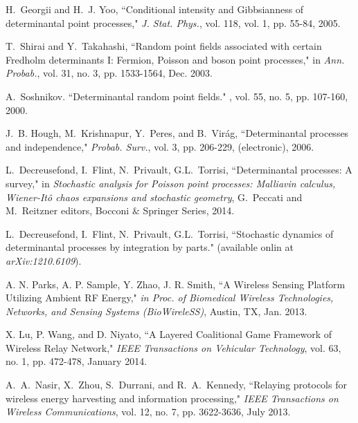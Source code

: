 \documentclass[12pt,draftclsnofoot,onecolumn]{IEEEtran}
\begin{document}
\begin{thebibliography}{99}
H.~Georgii and H.~J. Yoo, ``Conditional intensity and Gibbsianness of determinantal point processes," {\em J. Stat. Phys.}, vol. 118, vol. 1, pp. 55-84, 2005.

T.~Shirai and Y.~Takahashi, ``Random point fields associated with certain Fredholm determinants I: Fermion, Poisson and boson point processes," in {\em Ann. Probab.}, vol. 31, no. 3, pp. 1533-1564, Dec. 2003.

A.~Soshnikov. \newblock ``Determinantal random point fields." , vol. 55, no. 5, pp. 107-160, 2000.


J.~B. Hough, M.~Krishnapur, Y.~Peres, and B.~Vir{\'a}g, ``Determinantal processes and independence," {\em Probab. Surv.}, vol. 3, pp. 206-229, (electronic), 2006.

L.~Decreusefond, I.~Flint, N.~Privault, G.L.~Torrisi, ``Determinantal processes: A survey," in {\em Stochastic analysis for Poisson point processes: Malliavin calculus, Wiener-It\^o chaos expansions and stochastic geometry}, G.~Peccati and M.~Reitzner editors, Bocconi $\&$ Springer Series, 2014.

L.~Decreusefond, I.~Flint, N.~Privault, G.L.~Torrisi, ``Stochastic dynamics of determinantal processes by integration by parts."  (available onlin at {\em arXiv:1210.6109}).

A. N. Parks, A. P. Sample, Y. Zhao, J. R. Smith, ``A Wireless Sensing
Platform Utilizing Ambient RF Energy," \emph{in Proc. of Biomedical Wireless Technologies, Networks, and Sensing Systems (BioWireleSS)}, Austin, TX, Jan. 2013.

X. Lu, P. Wang, and D. Niyato, ``A Layered Coalitional Game Framework of Wireless Relay Network," \emph{IEEE Transactions on Vehicular Technology}, vol. 63, no. 1, pp. 472-478, January 2014. 


A.~A.~Nasir, X.~Zhou, S.~Durrani, and R.~A.~Kennedy, ``Relaying protocols for wireless energy harvesting and information processing," \emph{IEEE Transactions on Wireless Communications}, vol. 12, no. 7, pp. 3622-3636, July 2013.


 








 


















 


 


\end{thebibliography}


 
\end{document}
